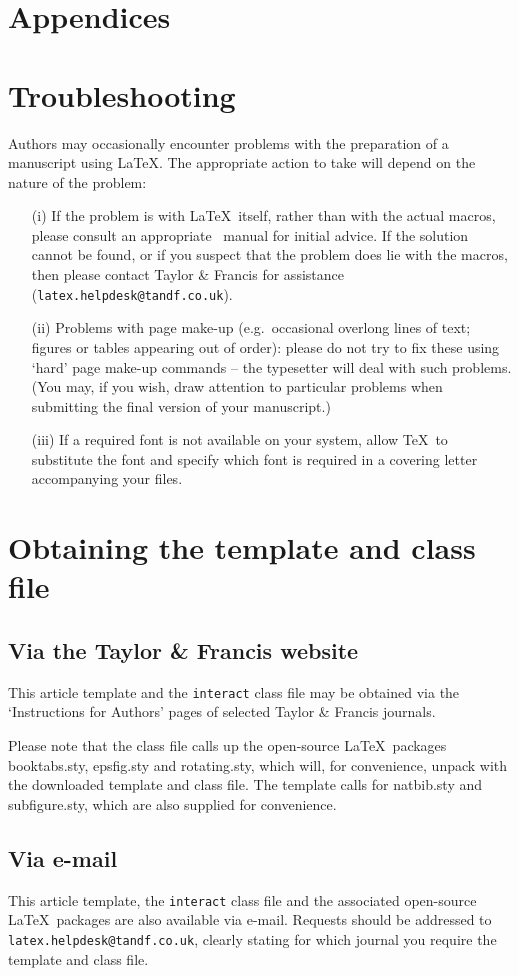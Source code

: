 \documentclass[]{interact}
\theoremstyle{plain}%
\theoremstyle{definition}
\theoremstyle{remark}
\begin{document}
\bigskip


\section{Appendices}

\appendix
\section{Troubleshooting}

Authors may occasionally encounter problems with the preparation of a manuscript using \LaTeX. The appropriate action to take will depend on the nature of the problem:
\begin{enumerate}
\item[(i)] If the problem is with \LaTeX\ itself, rather than with the actual macros, please consult an appropriate \LaTeXe\ manual for initial advice. If the solution cannot be found, or if you suspect that the problem does lie with the macros, then please contact Taylor \& Francis for assistance (\texttt{latex.helpdesk@tandf.co.uk}).
\item[(ii)] Problems with page make-up (e.g.\ occasional overlong lines of text; figures or tables appearing out of order): please do not try to fix these using `hard' page make-up commands -- the typesetter will deal with such problems. (You may, if you wish, draw attention to particular problems when submitting the final version of your manuscript.)
\item[(iii)] If a required font is not available on your system, allow \TeX\ to substitute the font and specify which font is required in a covering letter accompanying your files.
\end{enumerate}


\section{Obtaining the template and class file}

\subsection{Via the Taylor \& Francis website}

This article template and the \texttt{interact} class file may be obtained via the `Instructions for Authors' pages of selected Taylor \& Francis journals.

Please note that the class file calls up the open-source \LaTeX\ packages booktabs.sty, epsfig.sty and rotating.sty, which will, for convenience, unpack with the downloaded template and class file. The template calls for natbib.sty and subfigure.sty, which are also supplied for convenience.


\subsection{Via e-mail}

This article template, the \texttt{interact} class file and the associated open-source \LaTeX\ packages are also available via e-mail. Requests should be addressed to \texttt{latex.helpdesk@tandf.co.uk}, clearly stating for which journal you require the template and class file.
\end{document}
